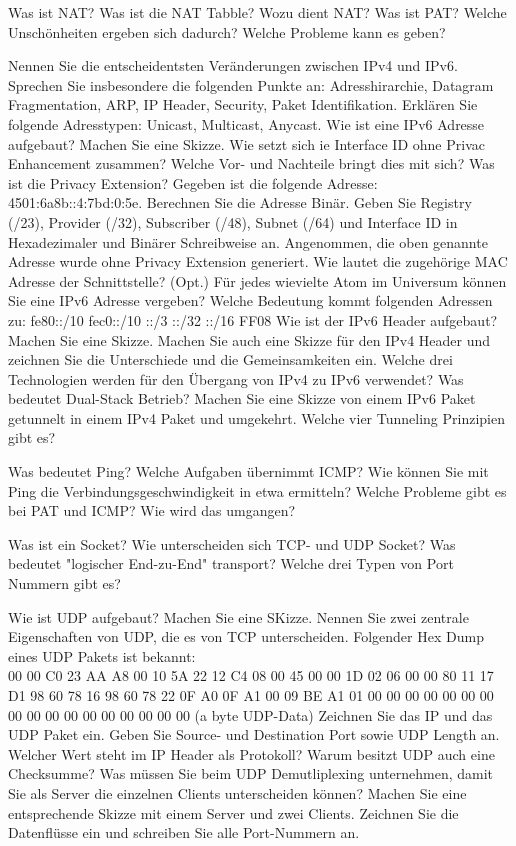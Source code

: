 \documentclass[ngerman,a4paper,12pt]{scrreprt}
\begin{document}
\olR
	\li Was ist NAT? Was ist die NAT Tabble?
	\li Wozu dient NAT?
	\li Was ist PAT? Welche Unschönheiten ergeben sich dadurch? Welche Probleme kann es geben?
\olS


\olR
	\li Nennen Sie die entscheidentsten Veränderungen zwischen IPv4 und IPv6. Sprechen Sie insbesondere die folgenden Punkte an: Adresshirarchie, Datagram Fragmentation, ARP, IP Header, Security, Paket Identifikation.
	\li Erklären Sie folgende Adresstypen: Unicast, Multicast, Anycast.
	\li Wie ist eine IPv6 Adresse aufgebaut? Machen Sie eine Skizze.
	\li Wie setzt sich ie Interface ID ohne Privac Enhancement zusammen? Welche Vor- und Nachteile bringt dies mit sich?
	\li Was ist die Privacy Extension?
	\li Gegeben ist die folgende Adresse: 4501:6a8b::4:7bd:0:5e. Berechnen Sie die Adresse Binär. Geben Sie Registry (/23), Provider (/32), Subscriber (/48), Subnet (/64) und Interface ID in Hexadezimaler und Binärer Schreibweise an.
	\li Angenommen, die oben genannte Adresse wurde ohne Privacy Extension generiert. Wie lautet die zugehörige MAC Adresse der Schnittstelle?
	\li (Opt.) Für jedes wievielte Atom im Universum können Sie eine IPv6 Adresse vergeben?
	\li Welche Bedeutung kommt folgenden Adressen zu:
		\ol
			\li fe80::/10
			\li fec0::/10
			\li 2000::/3
			::/32
			::/16
			\li FF08
		\olE
	\li Wie ist der IPv6 Header aufgebaut? Machen Sie eine Skizze. Machen Sie auch eine Skizze für den IPv4 Header und zeichnen Sie die Unterschiede und die Gemeinsamkeiten ein.
	\li Welche drei Technologien werden für den Übergang von IPv4 zu IPv6 verwendet?
	\li Was bedeutet Dual-Stack Betrieb?
	\li Machen Sie eine Skizze von einem IPv6 Paket getunnelt in einem IPv4 Paket und umgekehrt.
	\li Welche vier Tunneling Prinzipien gibt es?
\olS


\olR
	\li Was bedeutet Ping?
	\li Welche Aufgaben übernimmt ICMP?
	\li Wie können Sie mit Ping die Verbindungsgeschwindigkeit in etwa ermitteln?
	\li Welche Probleme gibt es bei PAT und ICMP? Wie wird das umgangen?
\olS


\olR
	\li Was ist ein Socket? Wie unterscheiden sich TCP- und UDP Socket?
	\li Was bedeutet "logischer End-zu-End" transport?
	\li Welche drei Typen von Port Nummern gibt es?
\olS

\olR
	\li Wie ist UDP aufgebaut? Machen Sie eine SKizze.
	\li Nennen Sie zwei zentrale Eigenschaften von UDP, die es von TCP unterscheiden.
	\li Folgender Hex Dump eines UDP Pakets ist bekannt: \\00 00 C0 23 AA A8 00 10 5A 22 12 C4 08 00 45 00
 00 1D 02 06 00 00 80 11 17 D1 98 60 78 16 98 60
 78 22 0F A0 0F A1 00 09 BE A1 01 00 00 00 00 00
 00 00 00 00 00 00 00 00 00 00 00 00 (a byte UDP-Data)
 		\ol
 			\li Zeichnen Sie das IP und das UDP Paket ein.
 			\li Geben Sie Source- und Destination Port sowie UDP Length an.
 			\li Welcher Wert steht im IP Header als Protokoll?
 		\olE
	 \li Warum besitzt UDP auch eine Checksumme?
	 \li Was müssen Sie beim UDP Demutliplexing unternehmen, damit Sie als Server die einzelnen Clients unterscheiden können? Machen Sie eine entsprechende Skizze mit einem Server und zwei Clients. Zeichnen Sie die Datenflüsse ein und schreiben Sie alle Port-Nummern an.
\olS
\end{document}
